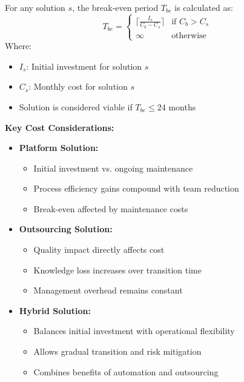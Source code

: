 \documentclass[12pt,a4paper]{article}
\newenvironment{definition}[1]
{\begin{mdframed}[style=definitionstyle,frametitle={Definition: #1}]}
{\end{mdframed}}
\newenvironment{observation}
{\begin{mdframed}[style=observationstyle,frametitle={Observation}]}
{\end{mdframed}}
\begin{document}
\begin{definition}{Break-Even Analysis}
For any solution $s$, the break-even period $T_{be}$ is calculated as:
\begin{equation}
    T_{be} = \begin{cases}
        \lceil\frac{I_s}{C_b - C_s}\rceil & \text{if } C_b > C_s \\
        \infty & \text{otherwise}
    \end{cases}
\end{equation}
Where:
\begin{itemize}
    \item $I_s$: Initial investment for solution $s$
    \item $C_s$: Monthly cost for solution $s$
    \item Solution is considered viable if $T_{be} \leq 24$ months
\end{itemize}
\end{definition}

\begin{observation}
\textbf{Key Cost Considerations:}
\begin{itemize}
    \item \textbf{Platform Solution:}
        \begin{itemize}
            \item Initial investment vs. ongoing maintenance
            \item Process efficiency gains compound with team reduction
            \item Break-even affected by maintenance costs
        \end{itemize}
    \item \textbf{Outsourcing Solution:}
        \begin{itemize}
            \item Quality impact directly affects cost
            \item Knowledge loss increases over transition time
            \item Management overhead remains constant
        \end{itemize}
    \item \textbf{Hybrid Solution:}
        \begin{itemize}
            \item Balances initial investment with operational flexibility
            \item Allows gradual transition and risk mitigation
            \item Combines benefits of automation and outsourcing
        \end{itemize}
\end{itemize}
\end{observation}
\end{document}
